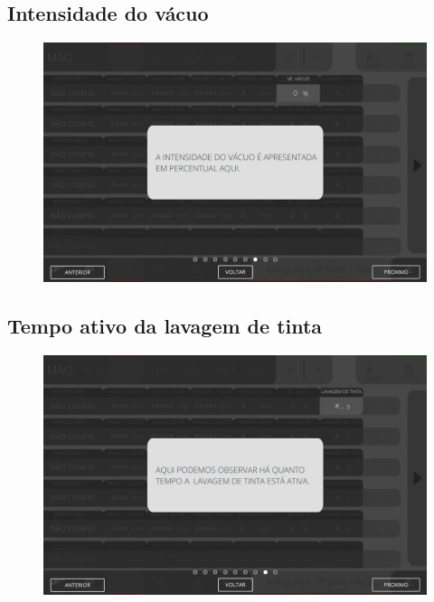 \subsection{Intensidade do vácuo}
\begin{figure}
    \centering
    \includegraphics[width=576 px,height=360 px]{src/imagesICV/04-printters/01-printters/settings/7.png}
\end{figure}
\newpage
\thispagestyle{fancy}
\vspace{\fill}

\subsection{Tempo ativo da lavagem de tinta}
\begin{figure}
    \centering
    \includegraphics[width=576 px,height=360 px]{src/imagesICV/04-printters/01-printters/settings/8.png}
\end{figure}
\newpage
\thispagestyle{fancy}
\vspace{\fill}

